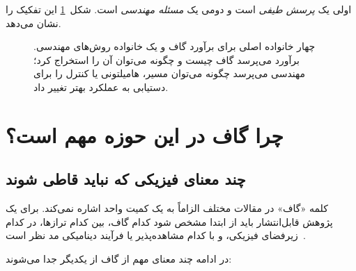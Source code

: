 اولی یک \emph{پرسش طیفی} است و دومی یک \emph{مسئله مهندسی} است.
شکل~\ref{fig:gap-methods-map} این تفکیک را نشان می‌دهد.

\begin{figure}[htbp]
	\centering
	\begin{latin}
		\resizebox{\ifdim\width>\textwidth\textwidth\else\width\fi}{!}{%
		}
	\end{latin}
	\caption{چهار خانواده اصلی برای برآورد گاف و یک خانواده روش‌های مهندسی. برآورد می‌پرسد گاف چیست و چگونه می‌توان آن را استخراج کرد؛ مهندسی می‌پرسد چگونه می‌توان مسیر، هامیلتونی یا کنترل را برای دستیابی به عملکرد بهتر تغییر داد.}
	\label{fig:gap-methods-map}
\end{figure}

\section{چرا گاف در این حوزه مهم است؟}

\subsection{چند معنای فیزیکی که نباید قاطی شوند}

کلمه «گاف» در مقالات مختلف الزاماً به یک کمیت واحد اشاره نمی‌کند.
برای یک پژوهش قابل‌انتشار باید از ابتدا مشخص شود کدام گاف، بین کدام ترازها، در کدام زیرفضای فیزیکی، و با کدام مشاهده‌پذیر یا فرآیند دینامیکی مد نظر است~\cite{Georgescu2014,AlbashLidar2018}.

در ادامه چند معنای مهم از گاف از یکدیگر جدا می‌شوند:

